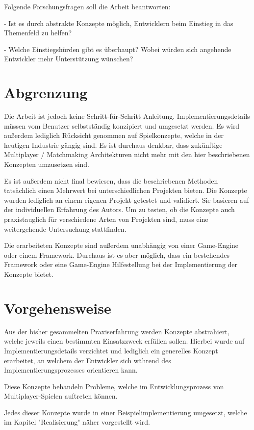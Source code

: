 Folgende Forschungsfragen soll die Arbeit beantworten:

- Ist es durch abstrakte Konzepte möglich, Entwicklern beim Einstieg in das Themenfeld zu helfen? 

- Welche Einstiegshürden gibt es überhaupt? Wobei würden sich angehende Entwickler mehr Unterstützung wünschen?

\section{Abgrenzung}

Die Arbeit ist jedoch keine Schritt-für-Schritt Anleitung. Implementierungsdetails müssen vom Benutzer selbstständig konzipiert und umgesetzt werden. Es wird außerdem lediglich Rücksicht genommen auf Spielkonzepte, welche in der heutigen Industrie gängig sind. Es ist durchaus denkbar, dass zukünftige Multiplayer / Matchmaking Architekturen nicht mehr mit den hier beschriebenen Konzepten umzusetzen sind.

Es ist außerdem nicht final bewiesen, dass die beschriebenen Methoden tatsächlich einen Mehrwert bei unterschiedlichen Projekten bieten. Die Konzepte wurden lediglich an einem eigenen Projekt getestet und validiert. Sie basieren auf der individuellen Erfahrung des Autors. Um zu testen, ob die Konzepte auch praxistauglich für verschiedene Arten von Projekten sind, muss eine weitergehende Untersuchung stattfinden.

Die erarbeiteten Konzepte sind außerdem unabhängig von einer Game-Engine oder einem Framework. Durchaus ist es aber möglich, dass ein bestehendes Framework oder eine Game-Engine Hilfestellung bei der Implementierung der Konzepte bietet. 


\section{Vorgehensweise}

Aus der bisher gesammelten Praxiserfahrung werden Konzepte abstrahiert, welche jeweils einen bestimmten Einsatzzweck erfüllen sollen. Hierbei wurde auf Implementierungsdetails verzichtet und lediglich ein generelles Konzept erarbeitet, an welchem der Entwickler sich während des Implementierungsprozesses orientieren kann.

Diese Konzepte behandeln Probleme, welche im Entwicklungsprozess von Multiplayer-Spielen auftreten können. 

Jedes dieser Konzepte wurde in einer Beispielimplementierung umgesetzt, welche im Kapitel "Realisierung" näher vorgestellt wird.

